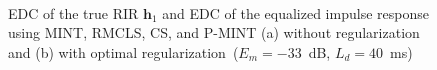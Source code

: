 \documentclass[draftcls,onecolumn,11pt]{IEEEtran}
\begin{document}
\begin{figure}[h]
\centering
\hbox{\hspace{-1.1cm}
}
\caption{EDC of the true RIR $\mathbf{h}_1$ and EDC of the equalized impulse response using MINT, RMCLS, CS, and P-MINT (a) without regularization and (b) with optimal regularization~($E_m = -33$~dB, $L_d = 40$~ms)}
\end{figure}
\end{document}
